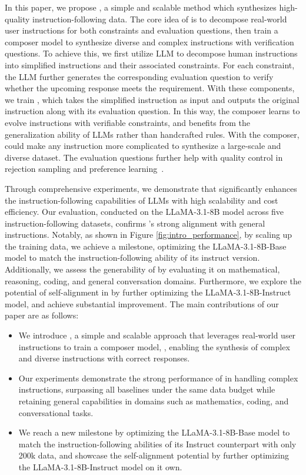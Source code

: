 In this paper, we propose \method, a simple and scalable method which synthesizes high-quality instruction-following data.
The core idea of \method is to decompose real-world user instructions for both constraints and evaluation questions, then train a composer model to synthesize diverse and complex instructions with verification questions.
To achieve this, we first utilize LLM to decompose human instructions into simplified instructions and their associated constraints. 
For each constraint, the LLM further generates the corresponding evaluation question to verify whether the upcoming response meets the requirement.
With these components, we train \textbf{\textit{\composer}}, which takes the simplified instruction as input and outputs the original instruction along with its evaluation question.
In this way, the composer learns to evolve instructions with verifiable constraints, and benefits from the generalization ability of LLMs rather than handcrafted rules.
With the composer, \method could make any instruction more complicated to synthesize a large-scale and diverse dataset. The evaluation questions further help with quality control in rejection sampling and preference learning~\citep{rafailov2024direct,chen2024noise}.


Through comprehensive experiments, we demonstrate that \method significantly enhances the instruction-following capabilities of LLMs with high scalability and cost efficiency. Our evaluation, conducted on the LLaMA-3.1-8B model across five instruction-following datasets, confirms \method's strong alignment with general instructions. Notably, as shown in Figure \ref{fig:intro_performance}, by scaling up the training data, we achieve a milestone, optimizing the LLaMA-3.1-8B-Base model to match the instruction-following ability of its instruct version. Additionally, we assess the generability of \method by evaluating it on mathematical, reasoning, coding, and general conversation domains. Furthermore, we explore the potential of self-alignment in \method by further optimizing the LLaMA-3.1-8B-Instruct model, and achieve substantial improvement. 
The main contributions of our paper are as follows:
\vspace{-3mm}
\begin{itemize}[nolistsep,leftmargin=*]
    \setlength\itemsep{0mm}
    \item We introduce \method, a simple and scalable approach that leverages real-world user instructions to train a composer model, \composer, enabling the synthesis of complex and diverse instructions with correct responses.
    \item Our experiments demonstrate the strong performance of \method in handling complex instructions, surpassing all baselines under the same data budget while retaining general capabilities in domains such as mathematics, coding, and conversational tasks.
    \item We reach a new milestone by optimizing the LLaMA-3.1-8B-Base model to match the instruction-following abilities of its Instruct counterpart with only 200k data, and showcase the self-alignment potential by further optimizing the LLaMA-3.1-8B-Instruct model on it own.

\end{itemize}